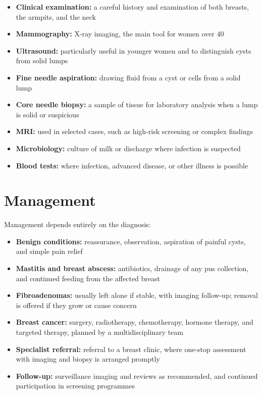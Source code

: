 \begin{itemize}
    \item \textbf{Clinical examination:} a careful history and examination of both breasts, the armpits, and the neck
    \item \textbf{Mammography:} X-ray imaging, the main tool for women over 40
    \item \textbf{Ultrasound:} particularly useful in younger women and to distinguish cysts from solid lumps
    \item \textbf{Fine needle aspiration:} drawing fluid from a cyst or cells from a solid lump
    \item \textbf{Core needle biopsy:} a sample of tissue for laboratory analysis when a lump is solid or suspicious
    \item \textbf{MRI:} used in selected cases, such as high-risk screening or complex findings
    \item \textbf{Microbiology:} culture of milk or discharge where infection is suspected
    \item \textbf{Blood tests:} where infection, advanced disease, or other illness is possible
\end{itemize}

\section*{Management}
Management depends entirely on the diagnosis:

\begin{itemize}
    \item \textbf{Benign conditions:} reassurance, observation, aspiration of painful cysts, and simple pain relief
    \item \textbf{Mastitis and breast abscess:} antibiotics, drainage of any pus collection, and continued feeding from the affected breast
    \item \textbf{Fibroadenomas:} usually left alone if stable, with imaging follow-up; removal is offered if they grow or cause concern
    \item \textbf{Breast cancer:} surgery, radiotherapy, chemotherapy, hormone therapy, and targeted therapy, planned by a multidisciplinary team
    \item \textbf{Specialist referral:} referral to a breast clinic, where one-stop assessment with imaging and biopsy is arranged promptly
    \item \textbf{Follow-up:} surveillance imaging and reviews as recommended, and continued participation in screening programmes
\end{itemize}

